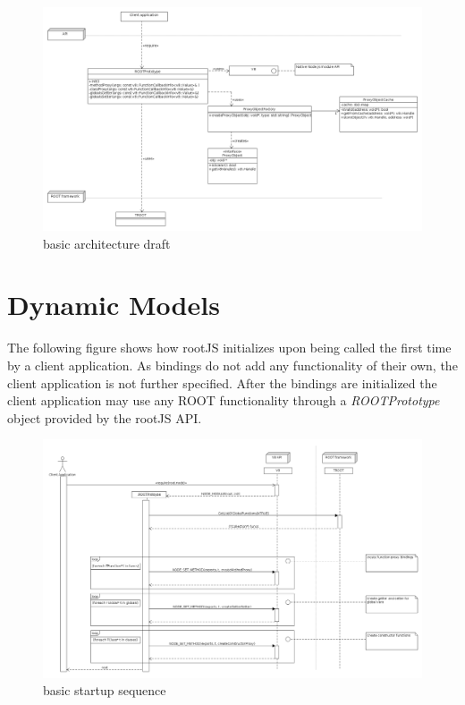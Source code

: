 \begin{figure}[htb]
	\centering
	\includegraphics[width=18cm]{./latex/resources/architecture.png}
	\caption{basic architecture draft}
\end{figure}

\pagebreak[4]

\section{Dynamic Models}
The following figure shows how rootJS initializes upon being called the first time by a client application. As bindings do not add any functionality of their own, the client application is not further specified. After the bindings are initialized the client application may use any ROOT functionality through a \textit{ROOTPrototype} object provided by the rootJS API.

\begin{figure}[htb]
	\centering
	\includegraphics[width=18cm]{./latex/resources/startupSequence.png}
	\caption{basic startup sequence}
\end{figure}

